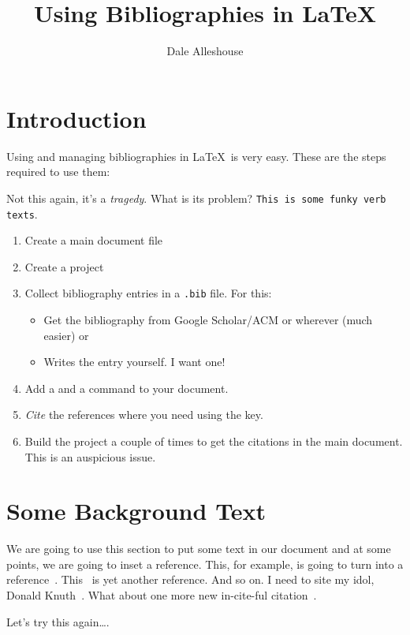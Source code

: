 \documentclass{article}
\begin{document}
\title{Using Bibliographies in \LaTeX}
\author{Dale Alleshouse}
\maketitle


\section{Introduction}
Using and managing bibliographies in \LaTeX\ is very easy. These are the steps required to use them:

Not this again, it's a \emph{tragedy}. What is its problem?  \verb|This is some funky verb texts|.

\begin{enumerate}
  \item Create a main document file
  \item Create a project
  \item Collect bibliography entries in a \verb|.bib| file. For this:
    \begin{itemize}
      \item Get the bibliography from Google Scholar/ACM or wherever (much easier) or
      \item Writes the entry yourself. I want one!
    \end{itemize}
  \item Add a \verb|| and a \verb|| command to your document.
  \item \emph{Cite} the references where you need using the key.
  \item Build the project a couple of times to get the citations in the main document. This is an
    auspicious issue.
\end{enumerate}

\section{Some Background Text}
We are going to use this section to put some text in our document and at some points, we are going
to inset a reference. This, for example, is going to turn into a
reference~\cite{se-cs-collab:nauman10}. This~\cite{nauman2011using} is yet another reference. And so
on.\cite{seo2011user} I need to site my idol, Donald Knuth~\cite{knuth1997art}. What about one more
new in-cite-ful citation~\cite{seo2011user}.

Let's try this again\ldots.





\end{document}
